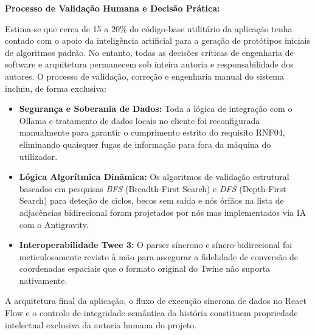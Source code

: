 {{\vspace{1em}

\noindent\textbf{Processo de Validação Humana e Decisão Prática:}

Estima-se que cerca de 15 a 20\% do código-base utilitário da aplicação tenha contado com o apoio da inteligência artificial para a geração de protótipos iniciais de algoritmos padrão. No entanto, todas as decisões críticas de engenharia de software e arquitetura permanecem sob inteira autoria e responsabilidade dos autores. O processo de validação, correção e engenharia manual do sistema incluiu, de forma exclusiva:

\begin{itemize}
    \item \textbf{Segurança e Soberania de Dados:} Toda a lógica de integração com o Ollama e tratamento de dados locais no cliente foi reconfigurada manualmente para garantir o cumprimento estrito do requisito RNF04, eliminando quaisquer fugas de informação para fora da máquina do utilizador.
    \item \textbf{Lógica Algorítmica Dinâmica:} Os algoritmos de validação estrutural baseados em pesquisas \textit{BFS} (Breadth-First Search) e \textit{DFS} (Depth-First Search) para deteção de ciclos, becos sem saída e nós órfãos na lista de adjacências bidirecional foram projetados por nós mas implementados via IA com o Antigravity.
    \item \textbf{Interoperabilidade Twee 3:} O parser síncrono e síncro-bidirecional foi meticulosamente revisto à mão para assegurar a fidelidade de conversão de coordenadas espaciais que o formato original do Twine não suporta nativamente.
\end{itemize}

A arquitetura final da aplicação, o fluxo de execução síncrona de dados no React Flow e o controlo de integridade semântica da história constituem propriedade intelectual exclusiva da autoria humana do projeto.
}{}
    
    \MediaOptionLogicBlank   
}{}
